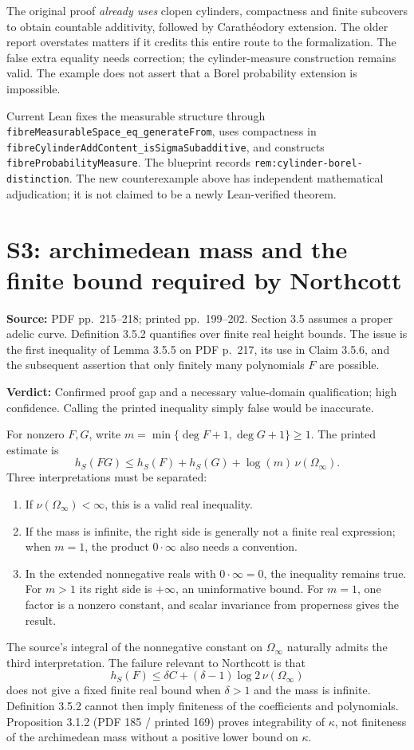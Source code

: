 \documentclass[11pt,a4paper]{article}
\newcommand{\code}[1]{{\small\nolinkurl{#1}}}
\newcommand{\loc}[2]{\par\noindent\textbf{Source:} PDF pp.~#1; printed pp.~#2.}
\newcommand{\verdict}[1]{\par\noindent\textbf{Verdict:} #1\par}
\begin{document}
The original proof \emph{already uses} clopen cylinders, compactness and finite subcovers to obtain countable additivity, followed by Carathéodory extension. The older report overstates matters if it credits this entire route to the formalization. The false extra equality needs correction; the cylinder-measure construction remains valid. The example does not assert that a Borel probability extension is impossible.

Current Lean fixes the measurable structure through
\code{fibreMeasurableSpace_eq_generateFrom}, uses compactness in
\code{fibreCylinderAddContent_isSigmaSubadditive}, and constructs
\code{fibreProbabilityMeasure}. The blueprint records
\code{rem:cylinder-borel-distinction}. The new counterexample above has independent mathematical adjudication; it is not claimed to be a newly Lean-verified theorem.


\clearpage
\section{S3: archimedean mass and the finite bound required by Northcott}\label{s3}
\loc{215--218}{199--202}
Section 3.5 assumes a proper adelic curve. Definition 3.5.2 quantifies over finite real height bounds. The issue is the first inequality of Lemma 3.5.5 on PDF p.~217, its use in Claim 3.5.6, and the subsequent assertion that only finitely many polynomials $F$ are possible.
\verdict{Confirmed proof gap and a necessary value-domain qualification; high confidence. Calling the printed inequality simply false would be inaccurate.}

For nonzero $F,G$, write $m=\min\{\deg F+1,\deg G+1\}\ge1$. The printed estimate is
\[
 h_S(FG)\le h_S(F)+h_S(G)+\log(m)\,\nu(\Omega_\infty).
\]
Three interpretations must be separated:
\begin{enumerate}
\item If $\nu(\Omega_\infty)<\infty$, this is a valid real inequality.
\item If the mass is infinite, the right side is generally not a finite real expression; when $m=1$, the product $0\cdot\infty$ also needs a convention.
\item In the extended nonnegative reals with $0\cdot\infty=0$, the inequality remains true. For $m>1$ its right side is $+\infty$, an uninformative bound. For $m=1$, one factor is a nonzero constant, and scalar invariance from properness gives the result.
\end{enumerate}
The source's integral of the nonnegative constant on $\Omega_\infty$ naturally admits the third interpretation. The failure relevant to Northcott is that
\[
 h_S(F)\le\delta C+(\delta-1)\log2\,\nu(\Omega_\infty)
\]
does not give a fixed finite real bound when $\delta>1$ and the mass is infinite. Definition 3.5.2 cannot then imply finiteness of the coefficients and polynomials. Proposition 3.1.2 (PDF 185 / printed 169) proves integrability of $\kappa$, not finiteness of the archimedean mass without a positive lower bound on $\kappa$.
\end{document}
